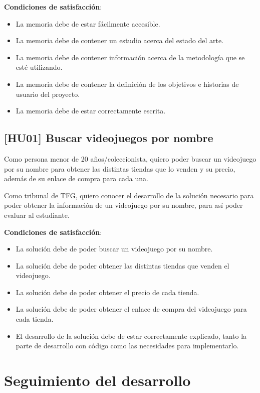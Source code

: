 \textbf{Condiciones de satisfacción}:

\begin{itemize}
    \item La memoria debe de estar fácilmente accesible.
    \item La memoria debe de contener un estudio acerca del estado del arte.
    \item La memoria debe de contener información acerca de la metodología que se 
    esté utilizando.
    \item La memoria debe de contener la definición de los objetivos e historias de 
    usuario del proyecto.
    \item La memoria debe de estar correctamente escrita.
\end{itemize}

\subsection{[HU01] Buscar videojuegos por nombre}

Como persona menor de 20 años/coleccionista, quiero poder buscar un videojuego por 
su nombre para obtener las distintas tiendas que lo venden y su precio, además de 
su enlace de compra para cada una.

Como tribunal de TFG, quiero conocer el desarrollo de la solución necesario para 
poder obtener la información de un videojuego por su nombre, para así poder 
evaluar al estudiante.

\textbf{Condiciones de satisfacción}:

\begin{itemize}
    \item La solución debe de poder buscar un videojuego por su nombre.
    \item La solución debe de poder obtener las distintas tiendas que venden el 
    videojuego.
    \item La solución debe de poder obtener el precio de cada tienda.
    \item La solución debe de poder obtener el enlace de compra del videojuego para 
    cada tienda.
    \item El desarrollo de la solución debe de estar correctamente explicado, tanto 
    la parte de desarrollo con código como las necesidades para implementarlo.
\end{itemize}

\section{Seguimiento del desarrollo}

